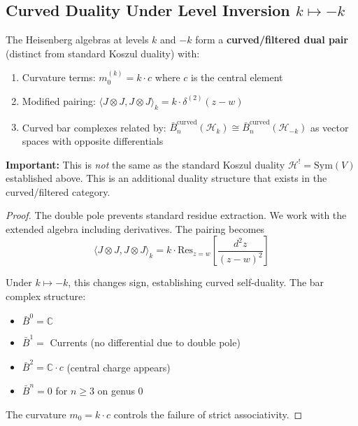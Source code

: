 \subsection{Curved Duality Under Level Inversion $k \mapsto -k$}

\begin{theorem}\label{thm:heisenberg-level-inversion}
The Heisenberg algebras at levels $k$ and $-k$ form a \textbf{curved/filtered dual pair} (distinct from standard Koszul duality) with:
\begin{enumerate}
\item Curvature terms: $m_0^{(k)} = k \cdot c$ where $c$ is the central element
\item Modified pairing: $\langle J \otimes J, J \otimes J \rangle_k = k \cdot \delta^{(2)}(z-w)$
\item Curved bar complexes related by: $\bar{B}^{\text{curved}}_n(\mathcal{H}_k) \cong \bar{B}^{\text{curved}}_n(\mathcal{H}_{-k})$ as vector spaces with opposite differentials
\end{enumerate}

\textbf{Important:} This is \emph{not} the same as the standard Koszul duality $\mathcal{H}^! = \text{Sym}(V)$ established above. This is an additional duality structure that exists in the curved/filtered category.
\end{theorem}

\begin{proof}
The double pole prevents standard residue extraction. We work with the extended algebra including derivatives. The pairing becomes
\[
\langle J \otimes J, J \otimes J \rangle_k = k \cdot \text{Res}_{z=w}\left[\frac{d^2z}{(z-w)^2}\right]
\]

Under $k \mapsto -k$, this changes sign, establishing curved self-duality. The bar complex structure:
\begin{itemize}
\item $\bar{B}^0 = \mathbb{C}$
\item $\bar{B}^1 = $ Currents (no differential due to double pole)
\item $\bar{B}^2 = \mathbb{C} \cdot c$ (central charge appears)
\item $\bar{B}^n = 0$ for $n \geq 3$ on genus 0
\end{itemize}
The curvature $m_0 = k \cdot c$ controls the failure of strict associativity.
\end{proof}

